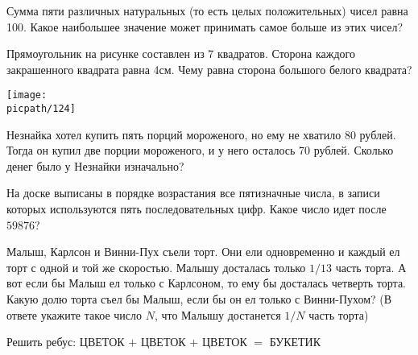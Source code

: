\begin{consultation}
\begin{listofex}
	\item Сумма пяти различных натуральных (то есть целых положительных) чисел равна 100. Какое
	наибольшее значение может принимать самое больше из этих чисел?
	\item Прямоугольник на рисунке составлен из 7 квадратов. Сторона каждого закрашенного квадрата
	равна 4см. Чему равна сторона большого белого квадрата?
	\begin{center}
		\texttt{[image: \\picpath/124]}
	\end{center}
	\item Незнайка хотел купить пять порций мороженого, но ему не хватило 80 рублей. Тогда он купил две порции мороженого, и у него осталось 70 рублей. Сколько денег было у Незнайки изначально?
	\item На доске выписаны в порядке возрастания все пятизначные числа, в записи которых используются
	пять последовательных цифр. Какое число идет после \( 59876 \)?
	\item Малыш, Карлсон и Винни-Пух съели торт. Они ели одновременно и каждый ел торт с одной и
	той же скоростью. Малышу досталась только \( 1/13 \) часть торта. А вот если бы Малыш ел только с Карлсоном, то ему бы досталась четверть торта. Какую долю торта съел бы Малыш, если бы он ел только с Винни-Пухом? (В ответе укажите такое число \( N \), что Малышу достанется \( 1/N \) часть торта)

	\item Решить ребус: ЦВЕТОК \( + \) ЦВЕТОК \( + \) ЦВЕТОК \( = \) БУКЕТИК
\end{listofex}
\end{consultation}

